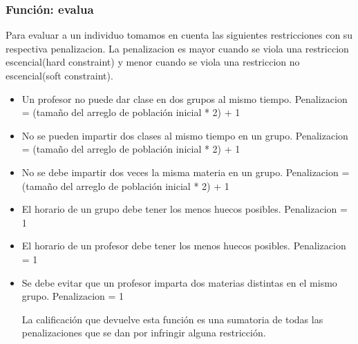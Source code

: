 \subsubsection{Funci\'on: evalua}

Para evaluar a un individuo tomamos en cuenta las siguientes restricciones con su respectiva penalizacion. La penalizacion es mayor cuando se viola una restriccion escencial(hard constraint) y menor cuando se viola una restriccion no escencial(soft constraint).

\begin{itemize}
	\item Un profesor no puede dar clase en dos grupos al mismo tiempo. Penalizacion = (tamaño del arreglo de población inicial * 2) + 1
	
	\item No se pueden impartir dos clases al mismo tiempo en un grupo. Penalizacion = (tamaño del arreglo de población inicial * 2) + 1
	
	\item No se debe impartir dos veces la misma materia en un grupo. Penalizacion = (tamaño del arreglo de población inicial * 2) + 1
	
	\item El horario de un grupo debe tener los menos huecos posibles. Penalizacion = 1
	
	\item El horario de un profesor debe tener los menos huecos posibles. Penalizacion = 1
	
	\item Se debe evitar que un profesor imparta dos materias distintas en el mismo grupo. Penalizacion = 1
	
	La calificación que devuelve esta función es una sumatoria de todas las penalizaciones que se dan por infringir alguna restricción.
	
\end{itemize}


